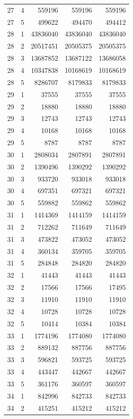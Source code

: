 \begin{longtable}{rrrrr}
27 & 4 & 559196 & 559196 & 559196 \\
27 & 5 & 499622 & 494470 & 494412 \\
28 & 1 & 43836040 & 43836040 & 43836040 \\
28 & 2 & 20517451 & 20505375 & 20505375 \\
28 & 3 & 13687852 & 13687122 & 13686058 \\
28 & 4 & 10347838 & 10168619 & 10168619 \\
28 & 5 & 8286707 & 8179833 & 8179833 \\
29 & 1 & 37555 & 37555 & 37555 \\
29 & 2 & 18880 & 18880 & 18880 \\
29 & 3 & 12743 & 12743 & 12743 \\
29 & 4 & 10168 & 10168 & 10168 \\
29 & 5 & 8787 & 8787 & 8787 \\
30 & 1 & 2808034 & 2807891 & 2807891 \\
30 & 2 & 1390496 & 1390292 & 1390292 \\
30 & 3 & 933720 & 933018 & 933018 \\
30 & 4 & 697351 & 697321 & 697321 \\
30 & 5 & 559882 & 559862 & 559862 \\
31 & 1 & 1414369 & 1414159 & 1414159 \\
31 & 2 & 712262 & 711649 & 711649 \\
31 & 3 & 473822 & 473052 & 473052 \\
31 & 4 & 360134 & 359705 & 359705 \\
31 & 5 & 284848 & 284820 & 284820 \\
32 & 1 & 41443 & 41443 & 41443 \\
32 & 2 & 17566 & 17566 & 17495 \\
32 & 3 & 11910 & 11910 & 11910 \\
32 & 4 & 10728 & 10728 & 10728 \\
32 & 5 & 10414 & 10384 & 10384 \\
33 & 1 & 1774196 & 1774080 & 1774080 \\
33 & 2 & 889132 & 887756 & 887756 \\
33 & 3 & 596821 & 593725 & 593725 \\
33 & 4 & 443447 & 442667 & 442667 \\
33 & 5 & 361176 & 360597 & 360597 \\
34 & 1 & 842996 & 842733 & 842733 \\
34 & 2 & 415251 & 415212 & 415212 \\

\end{longtable}
